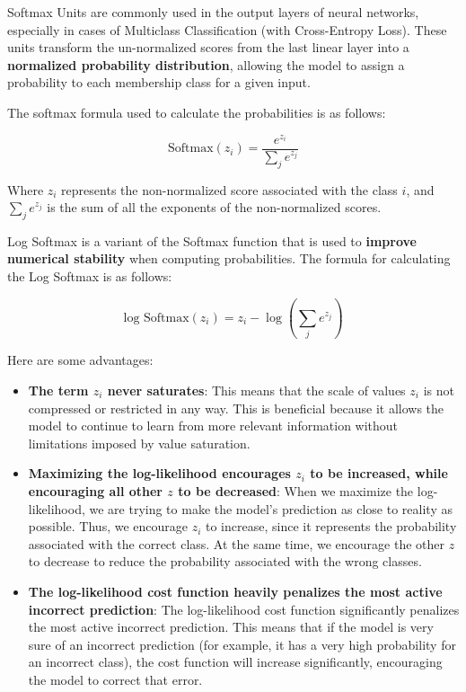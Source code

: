 Softmax Units are commonly used in the output layers of neural networks, especially in cases of Multiclass Classification (with Cross-Entropy Loss). These units transform the un-normalized scores from the last linear layer into a \textbf{normalized probability distribution}, allowing the model to assign a probability to each membership class for a given input.

The softmax formula used to calculate the probabilities is as follows:
{\Large
\begin{ceqn}
\begin{equation*}
\text{Softmax}(z_i) = \frac{e^{z_i}}{\sum_{j} e^{z_j}}
\end{equation*}
\end{ceqn}
}
\vspace{-0.6cm}

Where \( z_i \) represents the non-normalized score associated with the class \( i \), and \( \sum_{j} e^{z_j} \) is the sum of all the exponents of the non-normalized scores.

Log Softmax is a variant of the Softmax function that is used to \textbf{improve numerical stability} when computing probabilities. The formula for calculating the Log Softmax is as follows:
{\Large
\begin{ceqn}
\begin{equation*}
\text{log Softmax}(z_i) = z_i - \log\left(\sum_{j} e^{z_j}\right)
\end{equation*}
\end{ceqn}
}
\vspace{-0.6cm}

Here are some advantages:
\begin{itemize}
    \item \textbf{The term \( z_i \) never saturates}: This means that the scale of values \( z_i \) is not compressed or restricted in any way. This is beneficial because it allows the model to continue to learn from more relevant information without limitations imposed by value saturation.
    
    \item \textbf{Maximizing the log-likelihood encourages \( z_i \) to be increased, while encouraging all other \( z \) to be decreased}: When we maximize the log-likelihood, we are trying to make the model's prediction as close to reality as possible.   Thus, we encourage \( z_i \) to increase, since it represents the probability associated with the correct class. At the same time, we encourage the other \( z \) to decrease to reduce the probability associated with the wrong classes.
    
    \item \textbf{The log-likelihood cost function heavily penalizes the most active incorrect prediction}: The log-likelihood cost function significantly penalizes the most active incorrect prediction. This means that if the model is very sure of an incorrect prediction (for example, it has a very high probability for an incorrect class), the cost function will increase significantly, encouraging the model to correct that error.
\end{itemize}

